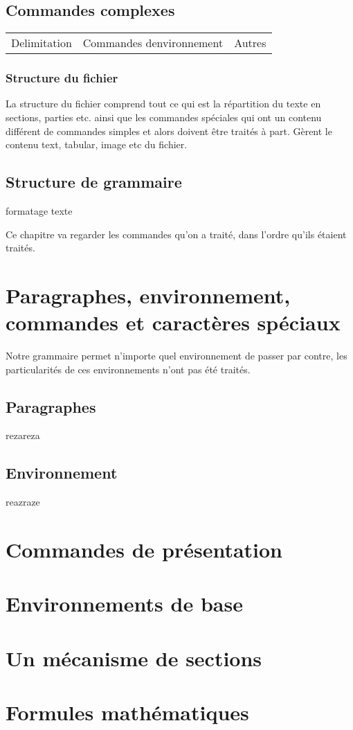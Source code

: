 \documentclass{report}
\begin{document}
{{\subsection{Commandes complexes}{
\begin{tabular}{llc} 
Delimitation&Commandes denvironnement&Autres
\end{tabular}
}\subsubsection{Structure du fichier}{
La structure du fichier comprend tout ce qui est la répartition du texte en sections, parties etc. ainsi que les commandes spéciales qui ont un contenu différent de commandes simples et alors doivent être traités à part.
Gèrent le contenu text, tabular, image etc du fichier.
}
}
\subsection{Structure de grammaire}{
formatage texte
  
Ce chapitre va regarder les commandes qu'on a traité, dans l'ordre qu'ils étaient traités.
}
}
\section{Paragraphes, environnement, commandes et caractères spéciaux}{
Notre grammaire permet n'importe quel environnement de passer par contre, les particularités de ces environnements n'ont pas été traités.
\subsection{Paragraphes}{rezareza}
\subsection{Environnement}{reazraze}
}
\section{Commandes de présentation}{}
\section{Environnements de base}{}
\section{Un mécanisme de sections}{}
\section{Formules mathématiques}{}
\end{document}
